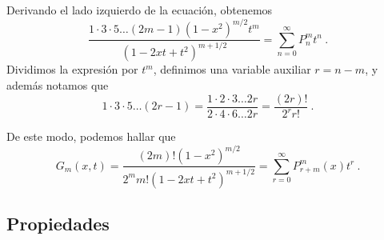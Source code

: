 Derivando el lado izquierdo de la ecuación, obtenemos
\begin{equation}
    \frac{1 \cdot 3 \cdot 5 \dots (2m-1) (1-x^2)^{m/2} t^m}{(1-2xt+t^2)^{m+1/2}} = \sum_{n=0}^\infty P_n^m t^n \ .
\end{equation}
Dividimos la expresión por $t^m$, definimos una variable auxiliar $r=n-m$, y además notamos que
\begin{equation}
    1 \cdot 3 \cdot 5 \dots (2r-1) = \frac{1 \cdot 2 \cdot 3 \dots 2r}{2 \cdot 4 \cdot 6 \dots 2r} = \frac{(2r)!}{2^r r!} \ .
\end{equation}

De este modo, podemos hallar que
\begin{equation}
    G_m(x,t) = \frac{(2m)! (1-x^2)^{m/2}}{2^m m! (1-2xt+t^2)^{m+1/2}} = \sum_{r=0}^\infty P_{r+m}^m(x) t^r \ .
\end{equation}

\subsection{Propiedades}

